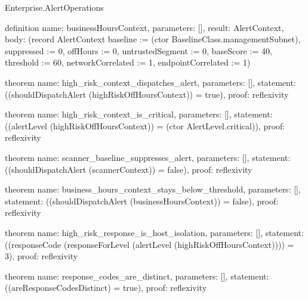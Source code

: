 \begin{lexlean}{Enterprise.AlertOperations}
\begin{semanticmodule}
definition{
  name: businessHoursContext,
  parameters: [],
  result: AlertContext,
  body: (record AlertContext {baseline := (ctor BaselineClass.managementSubnet), suppressed := 0, offHours := 0, untrustedSegment := 0, baseScore := 40, threshold := 60, networkCorrelated := 1, endpointCorrelated := 1})
}

theorem{
  name: high_risk_context_dispatches_alert,
  parameters: [],
  statement: ((shouldDispatchAlert (highRiskOffHoursContext)) = true),
  proof: reflexivity{}
}

theorem{
  name: high_risk_context_is_critical,
  parameters: [],
  statement: ((alertLevel (highRiskOffHoursContext)) = (ctor AlertLevel.critical)),
  proof: reflexivity{}
}

theorem{
  name: scanner_baseline_suppresses_alert,
  parameters: [],
  statement: ((shouldDispatchAlert (scannerContext)) = false),
  proof: reflexivity{}
}

theorem{
  name: business_hours_context_stays_below_threshold,
  parameters: [],
  statement: ((shouldDispatchAlert (businessHoursContext)) = false),
  proof: reflexivity{}
}

theorem{
  name: high_risk_response_is_host_isolation,
  parameters: [],
  statement: ((responseCode (responseForLevel (alertLevel (highRiskOffHoursContext)))) = 3),
  proof: reflexivity{}
}

theorem{
  name: response_codes_are_distinct,
  parameters: [],
  statement: ((areResponseCodesDistinct) = true),
  proof: reflexivity{}
}
\end{semanticmodule}
\end{lexlean}
